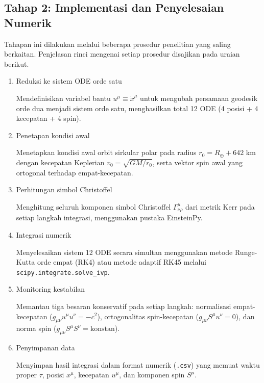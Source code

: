 \subsection{Tahap 2: Implementasi dan Penyelesaian Numerik}
\label{subsec:tahap2}

Tahapan ini dilakukan melalui beberapa prosedur penelitian yang saling berkaitan. Penjelasan rinci mengenai setiap prosedur disajikan pada uraian berikut.

\begin{enumerate}[label=\arabic*)]
    \item Reduksi ke sistem ODE orde satu

    Mendefinisikan variabel bantu $u^\mu \equiv \dot{x}^\mu$ untuk mengubah persamaan geodesik orde dua menjadi sistem orde satu, menghasilkan total 12 ODE (4 posisi + 4 kecepatan + 4 spin).

    \item Penetapan kondisi awal

    Menetapkan kondisi awal orbit sirkular polar pada radius $r_0 = R_\oplus + 642$ km dengan kecepatan Keplerian $v_0 = \sqrt{GM/r_0}$, serta vektor spin awal yang ortogonal terhadap empat-kecepatan.

    \item Perhitungan simbol Christoffel

    Menghitung seluruh komponen simbol Christoffel $\Gamma^\mu_{\nu\rho}$ dari metrik Kerr pada setiap langkah integrasi, menggunakan pustaka EinsteinPy.

    \item Integrasi numerik

    Menyelesaikan sistem 12 ODE secara simultan menggunakan metode Runge-Kutta orde empat (RK4) atau metode adaptif RK45 melalui \texttt{scipy.integrate.solve\_ivp}.

    \item Monitoring kestabilan

    Memantau tiga besaran konservatif pada setiap langkah: normalisasi empat-kecepatan ($g_{\mu\nu}u^\mu u^\nu = -c^2$), ortogonalitas spin-kecepatan ($g_{\mu\nu}S^\mu u^\nu = 0$), dan norma spin ($g_{\mu\nu}S^\mu S^\nu = \text{konstan}$).

    \item Penyimpanan data

    Menyimpan hasil integrasi dalam format numerik (\texttt{.csv}) yang memuat waktu proper $\tau$, posisi $x^\mu$, kecepatan $u^\mu$, dan komponen spin $S^\mu$.
\end{enumerate}

